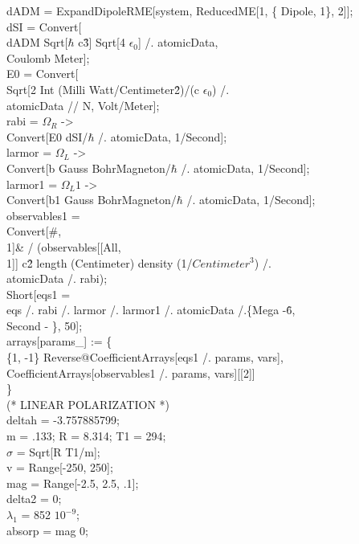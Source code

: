 \begin{enumerate}
dADM = ExpandDipoleRME[system, ReducedME[1, \{ Dipole, 1\}, 2]];\\
dSI = Convert[\\
   dADM Sqrt[$\hbar$ c\^ 3] Sqrt[4 $\epsilon_0$] /. atomicData, \\
   Coulomb Meter];\\
E0 = Convert[\\
   Sqrt[2 Int (Milli Watt/Centimeter\^ 2)/(c $\epsilon_0$) /. \\
     atomicData // N, Volt/Meter];\\
rabi = $\Omega_R$ -\textgreater \\
   Convert[E0 dSI/$\hbar$ /. atomicData, 1/Second]; \\
larmor = $\Omega_L$ -\textgreater \\
   Convert[b Gauss BohrMagneton/$\hbar$ /. atomicData, 1/Second];\\
larmor1 = $\Omega_L1$ -\textgreater \\
   Convert[b1 Gauss BohrMagneton/$\hbar$ /. atomicData, 1/Second];\\
observables1 = \\
  Convert[\#, \\
     1]\& / \@ (observables[[All, \\
        1]] c\^ 2 length (Centimeter) density (1/$Centimeter^3$) /. \\
      atomicData /. rabi); \\
Short[eqs1 = \\
   eqs /. rabi /. larmor /. larmor1 /. atomicData /.\{Mega -\^ 6, \\
     Second - \}, 50]; \\
arrays[params\_] := \{ \\
  \{1, -1\} Reverse@CoefficientArrays[eqs1 /. params, vars], \\
  CoefficientArrays[observables1 /. params, vars][[2]] \\
  \}\\
(*  LINEAR POLARIZATION *)\\
deltah = -3.757885799;\\
m = .133; R = 8.314; T1 = 294;\\
$\sigma$ = Sqrt[R T1/m];\\
v = Range[-250, 250];\\
mag = Range[-2.5, 2.5, .1];\\
delta2 = 0;\\
$\lambda_1$ = 852  $10^{-9}$;\\
absorp = mag 0;\\

\end{enumerate}
